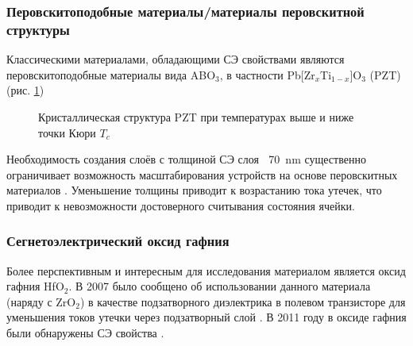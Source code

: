 \subsubsection{Перовскитоподобные материалы/материалы перовскитной структуры}
Классическими материалами, обладающими СЭ свойствами являются перовскитоподобные материалы вида ABO\(_3\), в частности Pb[Zr\(_x\)Ti\(_{1-x}\)]O\(_3\) (PZT) (рис. \cref{fig:pzt})
\begin{figure}[ht]
    \caption{Кристаллическая структура PZT при температурах выше и ниже точки Кюри \(T_c\)}\label{fig:pzt}
\end{figure}

Необходимость создания слоёв с толщиной СЭ слоя \(~\) \SI{70}{\nano\meter} существенно ограничивает возможность масштабирования устройств на основе перовскитных материалов \cite{parkReviewPerspectiveFerroelectric2018}. Уменьшение толщины приводит к возрастанию тока утечек, что приводит к невозможности достоверного считывания состояния ячейки.
\subsubsection{Сегнетоэлектрический оксид гафния}\label{sec:ch2/sec1}
Более перспективным и интересным для исследования материалом является оксид гафния HfO\(_2\). В 2007 было сообщено об использовании данного материала (наряду с ZrO\(_2\)) в качестве подзатворного диэлектрика в полевом транзисторе для уменьшения токов утечки через подзатворный слой \cite{bohrHighkSolution2007}. В 2011 году в оксиде гафния были обнаружены СЭ свойства \cite{bosckeFerroelectricityHafniumOxide2011}.

